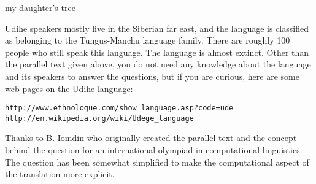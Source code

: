 \documentclass[11pt]{article}
\begin{document}
\begin{exe}
\begin{exe}
\begin{xlist}
{\ex my daughter's tree

\begin{soln}
\end{soln}
}

\end{xlist}

\end{exe}

Udihe speakers mostly live in the Siberian far east, 
and the language is classified as belonging to the Tungus-Manchu language
family. There are roughly 100 people who still speak this language. The language
is almost extinct. Other than the parallel text given above, you do not need any knowledge about the language
and its speakers to answer the questions, but if you are curious, here are
some web pages on the Udihe language:

{\small
\begin{verbatim}
http://www.ethnologue.com/show_language.asp?code=ude
http://en.wikipedia.org/wiki/Udege_language
\end{verbatim}
}

\begin{comment}
{\bf Hint}
\bigskip

All the expressions above denote something (call it ${\cal Y}$) belonging to someone
or something else (call it ${\cal X}$). In English, the predicate of possession
$\textsf{Possess}({\cal X}, {\cal Y})$
would be denoted by the phrase {\it the ${\cal Y}$ of the ${\cal X}$} / {\it the ${\cal X}$'s ${\cal Y}$}, 
e.g. {\it the stool's leg} 
or {\it the boy's money}. How is this predicate expressed
in Udihe? 

\bigskip

In English, we can use the expression ${\cal X}$'s ${\cal Y}$ 
if the predicate indicates that ${\cal Y}$ is a part of ${\cal X}$, 
e.g. {\it the stool's leg}, or if the predicate indicates that ${\cal Y}$ is separate from 
and belongs to ${\cal X}$, e.g. {\it the boy's money}. How are these two predicates
expressed in Udihe? 

\bigskip

Things get a bit more interesting when we add in another component and we have
two possession predicates. Depending on how they interact, we can observe
different cases: for instance,  
${\cal X}$ ${\cal Y}$'s ${\cal Z}$, e.g. {\it \fbox{thy son}'s shoulder}  or
${\cal X}$'s ${\cal Y}$ ${\cal Z}$, e.g. {\it my \fbox{boar head}}.

\bigskip
\bigskip
\end{comment}

{\small
Thanks to B. Iomdin who originally created the parallel text and the concept
behind the question for an international olympiad in computational linguistics.
The question has been somewhat simplified to make the computational aspect of
the translation more explicit.
}


\end{exe}
\end{document}
